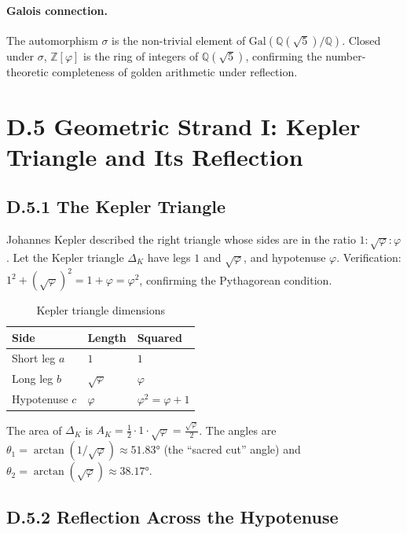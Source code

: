 \paragraph{Galois connection.}
The automorphism $\sigma$ is the non-trivial element of
$\mathrm{Gal}(\mathbb{Q}(\sqrt{5})/\mathbb{Q})$.
Closed under $\sigma$, $\mathbb{Z}[\varphi]$ is the ring of integers of
$\mathbb{Q}(\sqrt{5})$, confirming the number-theoretic completeness of
golden arithmetic under reflection.

\section*{D.5  Geometric Strand I: Kepler Triangle and Its Reflection}

\subsection*{D.5.1  The Kepler Triangle}

Johannes Kepler described the right triangle whose sides are in the ratio
$1 : \sqrt{\varphi} : \varphi$ \cite{kepler_harmonices}.
Let the Kepler triangle $\Delta_K$ have legs $1$ and $\sqrt{\varphi}$, and
hypotenuse $\varphi$.  Verification: $1^2 + (\sqrt{\varphi})^2 = 1 + \varphi = \varphi^2$,
confirming the Pythagorean condition.

\begin{table}[h]
\centering
\caption{Kepler triangle dimensions}
\begin{tabular}{lll}
\toprule
Side & Length & Squared \\
\midrule
Short leg $a$ & $1$ & $1$ \\
Long leg $b$ & $\sqrt{\varphi}$ & $\varphi$ \\
Hypotenuse $c$ & $\varphi$ & $\varphi^2 = \varphi + 1$ \\
\bottomrule
\end{tabular}
\end{table}

The area of $\Delta_K$ is $A_K = \tfrac{1}{2}\cdot 1 \cdot \sqrt{\varphi} = \tfrac{\sqrt{\varphi}}{2}$.
The angles are $\theta_1 = \arctan(1/\sqrt{\varphi}) \approx 51.83°$ (the ``sacred cut'' angle)
and $\theta_2 = \arctan(\sqrt{\varphi}) \approx 38.17°$.

\subsection*{D.5.2  Reflection Across the Hypotenuse}

